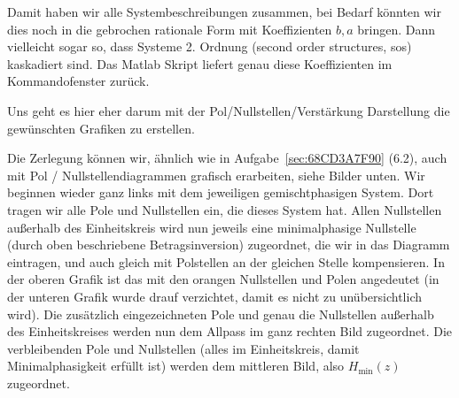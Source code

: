 \begin{Loesung}
Damit haben wir alle Systembeschreibungen zusammen,
bei Bedarf könnten wir dies noch in die gebrochen rationale Form
mit Koeffizienten $b,a$ bringen. Dann vielleicht sogar so, dass Systeme 2. Ordnung
(second order structures, sos) kaskadiert sind. Das Matlab Skript liefert
genau diese Koeffizienten im Kommandofenster zurück.

Uns geht es hier eher darum mit der Pol/Nullstellen/Verstärkung Darstellung
die gewünschten Grafiken zu erstellen.

Die Zerlegung können wir, ähnlich wie in Aufgabe~\ref{sec:68CD3A7F90} (6.2), auch mit
Pol / Nullstellendiagrammen grafisch erarbeiten, siehe Bilder unten.
Wir beginnen wieder ganz links mit dem jeweiligen gemischtphasigen System.
Dort tragen wir alle Pole und Nullstellen ein, die dieses System hat.
Allen Nullstellen außerhalb des Einheitskreis wird nun jeweils
eine minimalphasige Nullstelle (durch oben beschriebene Betragsinversion)
zugeordnet, die wir in das Diagramm eintragen, und auch gleich
mit Polstellen an der gleichen Stelle kompensieren.
%
In der oberen Grafik ist das mit den orangen
Nullstellen und Polen angedeutet (in der unteren Grafik wurde drauf verzichtet,
damit es nicht zu unübersichtlich wird). Die zusätzlich eingezeichneten Pole
und genau die Nullstellen außerhalb des Einheitskreises werden nun dem Allpass
im ganz rechten Bild zugeordnet.
Die verbleibenden Pole und Nullstellen (alles im Einheitskreis, damit
Minimalphasigkeit erfüllt ist) werden dem mittleren Bild, also $H_\mathrm{min}(z)$
zugeordnet.


\end{Loesung}
